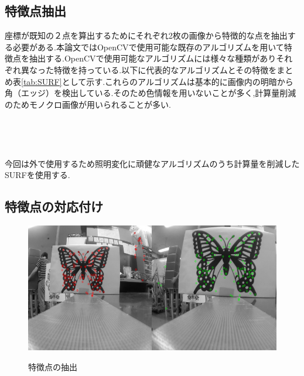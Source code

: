 \documentclass[12pt,oneside]{sotsuken_paper}
\begin{document}
\subsection{特徴点抽出}

座標が既知の２点を算出するためにそれぞれ2枚の画像から特徴的な点を抽出する必要がある.本論文ではOpenCVで使用可能な既存のアルゴリズムを用いて特徴点を抽出する.OpenCVで使用可能なアルゴリズムには様々な種類がありそれぞれ異なった特徴を持っている.以下に代表的なアルゴリズムとその特徴をまとめ表\ref{tab:SURF}として示す.これらのアルゴリズムは基本的に画像内の明暗から角（エッジ）を検出している.そのため色情報を用いないことが多く,計算量削減のためモノクロ画像が用いられることが多い.

\begin{table}[h] 
 　\begin{center} 
    \caption{代表的な特徴点抽出アルゴリズム} 
    \small 
　   \label{tab:SURF} 
  \end{center} 
\end{table}

今回は外で使用するため照明変化に頑健なアルゴリズムのうち計算量を削減したSURFを使用する.


\subsection{特徴点の対応付け}

\begin{figure}[htp]
 \begin{center}
  \includegraphics[width=120mm]{img/soft/surf.png}
 　\caption{特徴点の抽出}
  \label{fig:surf}%
 \end{center}
\end{figure}
\end{document}
